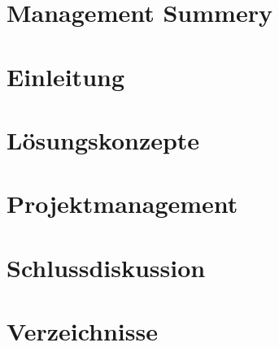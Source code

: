 \documentclass[11pt]{scrartcl}
\begin{document}
        
        \clearpage

        \tableofcontents
        \clearpage

        \section{Management Summery}
        
        \clearpage
        \section{Einleitung}
        
        \clearpage
        \section{Lösungskonzepte}
        
        \clearpage
        
        \clearpage
        
        \clearpage
        
        \clearpage
        
        \clearpage
        
        \clearpage
        
        \clearpage
        
        \clearpage
        
        \clearpage
        
        \clearpage
        
        \clearpage
        
        \clearpage
        \section{Projektmanagement}
        
        \clearpage
        \section{Schlussdiskussion}
        
        \clearpage
        \section{Verzeichnisse}
        \listoffigures
        \listoftables
        

    
\end{document}
